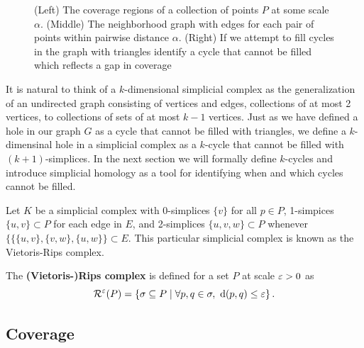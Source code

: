 \begin{figure}[htbp]
     \caption{(Left) The coverage regions of a collection of points $P$ at some scale $\alpha$.
            (Middle) The neighborhood graph with edges for each pair of points within pairwise distance $\alpha$.
            (Right) If we attempt to fill cycles in the graph with triangles identify a cycle that cannot be filled which reflects a gap in coverage}
     \label{fig:holes}
 \end{figure}

It is natural to think of a $k$-dimensional simplicial complex as the generalization of an undirected graph consisting of vertices and edges, collections of at most 2 vertices, to collections of sets of at most $k-1$ vertices.
Just as we have defined a hole in our graph $G$ as a cycle that cannot be filled with triangles, we define a $k$-dimensinal hole in a simplicial complex as a $k$-cycle that cannot be filled with $(k+1)$-simplices.
In the next section we will formally define $k$-cycles and introduce simplicial homology as a tool for identifying when and which cycles cannot be filled.

Let $K$ be a simplicial complex with 0-simplices $\{v\}$ for all $p\in P$, 1-simpices $\{u, v\}\subset P$ for each edge in $E$, and 2-simplices $\{u,v,w\}\subset P$ whenever $\{\{\{u,v\},\{v,w\},\{u,w\}\}\subset E$.
This particular simplicial complex is known as the Vietoris-Rips complex.
\begin{definition}
    The \textbf{(Vietoris-)Rips complex} is defined for a set $P$ at scale $\varepsilon > 0$ as
    \[ \mathcal{R}^\varepsilon(P) = \left\{\sigma \subseteq P\mid \forall p,q\in\sigma,\ \mathrm{d}(p, q)\leq\varepsilon\right\}. \]
\end{definition}


\subsection{Coverage}

